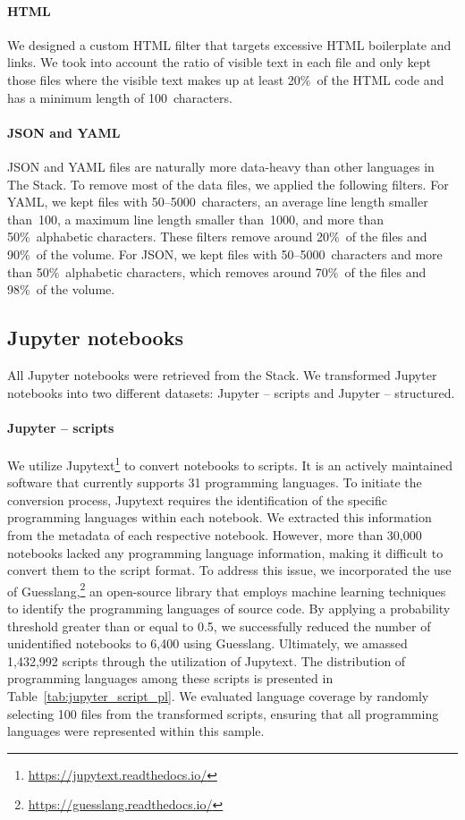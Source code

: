 \paragraph{HTML} We designed a custom HTML filter that targets excessive HTML boilerplate and links. We took into account the ratio of visible text in each file and only kept those files where the visible text makes up at least 20\%~of the HTML code and has a minimum length of 100~characters.

\paragraph{JSON and YAML} JSON and YAML files are naturally more data-heavy than other languages in The Stack. To remove most of the data files, we applied the following filters. For YAML, we kept files with 50--5000~characters, an average line length smaller than~100, a maximum line length smaller than~1000, and more than 50\%~alphabetic characters. These filters remove around 20\%~of the files and 90\%~of the volume. For JSON, we kept files with 50--5000~characters and more than 50\%~alphabetic characters, which removes around 70\%~of the files and 98\%~of the volume. 

\subsection{Jupyter notebooks} All Jupyter notebooks were retrieved from the Stack. We transformed Jupyter notebooks into two different datasets: Jupyter -- scripts and Jupyter -- structured. 

\paragraph{Jupyter -- scripts} We utilize Jupytext\footnote{\url{https://jupytext.readthedocs.io/}} to convert notebooks to scripts. It is an actively maintained software that currently supports 31 programming languages. To initiate the conversion process, Jupytext requires the identification of the specific programming languages within each notebook. We extracted this information from the metadata of each respective notebook. However, more than 30,000 notebooks lacked any programming language information, making it difficult to convert them to  the script format. To address this issue, we incorporated the use of Guesslang,\footnote{\url{https://guesslang.readthedocs.io/}} an open-source library that employs machine learning techniques to identify the programming languages of source code. By applying a probability threshold greater than or equal to 0.5, we successfully reduced the number of unidentified notebooks to 6,400 using Guesslang. Ultimately, we amassed 1,432,992 scripts through the utilization of Jupytext. The distribution of programming languages among these scripts is presented in Table~\ref{tab:jupyter_script_pl}. We evaluated language coverage by randomly selecting 100 files from the transformed scripts, ensuring that all programming languages were represented within this sample. 

